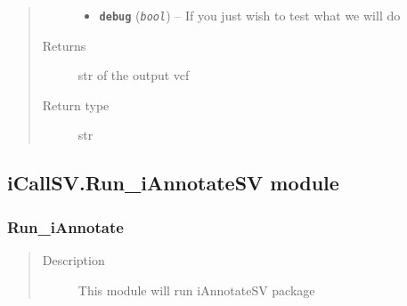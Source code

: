 \documentclass[letterpaper,10pt,english]{sphinxmanual}
\begin{document}
\begin{fulllineitems}
\begin{quote}
\begin{description}
\begin{itemize}
\item {} 
\textbf{\texttt{debug}} (\emph{\texttt{bool}}) -- If you just wish to test what we will do

\end{itemize}

\item[{Returns}] \leavevmode
str of the output vcf

\item[{Return type}] \leavevmode
str

\end{description}\end{quote}

\end{fulllineitems}



\subsection{iCallSV.Run\_iAnnotateSV module}
\label{iCallSV:icallsv-run-iannotatesv-module}\label{iCallSV:module-iCallSV.Run_iAnnotateSV}

\subsubsection{Run\_iAnnotate}
\label{iCallSV:run-iannotate}\begin{quote}\begin{description}
\item[{Description}] \leavevmode
This module will run iAnnotateSV package

\end{description}\end{quote}
\end{document}

